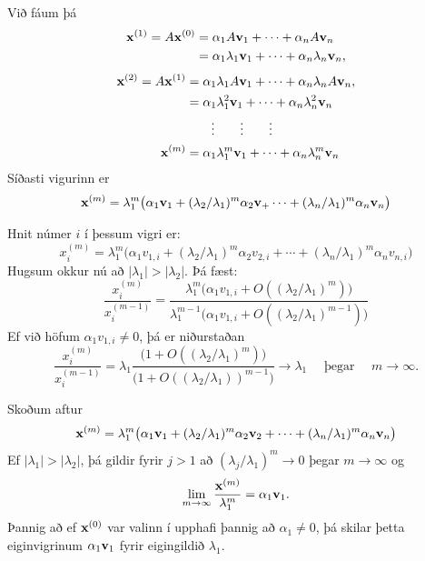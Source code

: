 \documentclass[icelandic,a4paper,12pt]{article}
\begin{document}
Við fáum þá 
\begin{align*}
\mbox{${\bf x}$}^{(1)} =A\mbox{${\bf x}$}^{(0)}&=\alpha_1A\mbox{${\bf v}$}_1+\cdots+\alpha_nA\mbox{${\bf v}$}_n\\
&=\alpha_1\lambda_1\mbox{${\bf v}$}_1+\cdots+\alpha_n\lambda_n\mbox{${\bf v}$}_n,
\end{align*}
\pause
\begin{align*}
\mbox{${\bf x}$}^{(2)}=A\mbox{${\bf x}$}^{(1)}&=\alpha_1\lambda_1A\mbox{${\bf v}$}_1+\cdots+\alpha_n\lambda_nA\mbox{${\bf v}$}_n,\\
&=\alpha_1\lambda_1^2\mbox{${\bf v}$}_1+\cdots+\alpha_n\lambda_n^2\mbox{${\bf v}$}_n\\ 
& \qquad  \vdots\qquad  \vdots \qquad \vdots\\
\mbox{${\bf x}$}^{(m)}&=\alpha_1\lambda_1^m\mbox{${\bf v}$}_1+\cdots+\alpha_n\lambda_n^m\mbox{${\bf v}$}_n
\end{align*}
\pause
Síðasti vigurinn er 
$$
\mbox{${\bf x}$}^{(m)}=  \lambda_1^m 
\big(\alpha_1\mbox{${\bf v}$}_1+(\lambda_2/\lambda_1)^m\alpha_2\mbox{${\bf v}$}_+\cdots+
(\lambda_n/\lambda_1)^m \alpha_n\mbox{${\bf v}$}_n\big)
$$



Hnit númer $i$ í þessum vigri er: 
$$
x_i^{(m)}=  \lambda_1^m 
\big(\alpha_1v_{1,i}+(\lambda_2/\lambda_1)^m\alpha_2v_{2,i}+\cdots+
(\lambda_n/\lambda_1)^m \alpha_nv_{n,i}\big)
$$
\pause
Hugsum okkur nú að $|\lambda_1|>|\lambda_2|$. Þá fæst:
$$
\dfrac{x_i^{(m)}}{x_i^{(m-1)}}
=
\dfrac{\lambda_1^m\big(\alpha_1v_{1,i}+O((\lambda_2/\lambda_1)^m)\big)}
{\lambda_1^{m-1}\big(\alpha_1v_{1,i}+O((\lambda_2/\lambda_1)^{m-1})\big)}
$$
\pause
Ef við höfum $\alpha_1v_{1,i}\neq 0$, þá er niðurstaðan
$$
\dfrac{x_i^{(m)}}{x_i^{(m-1)}}
=\lambda_1
\dfrac{\big(1+O((\lambda_2/\lambda_1)^m)\big)}
{\big(1+O((\lambda_2/\lambda_1))^{m-1}\big)} \to \lambda_1
\quad \text{ þegar }  \quad m\to \infty.
$$

Skoðum aftur
$$
\mbox{${\bf x}$}^{(m)}=  \lambda_1^m 
\big(\alpha_1\mbox{${\bf v}$}_1+(\lambda_2/\lambda_1)^m\alpha_2\mbox{${\bf v}$}_2+\cdots+
(\lambda_n/\lambda_1)^m \alpha_n\mbox{${\bf v}$}_n\big)
$$
\pause
Ef $|\lambda_1|>|\lambda_2|$, þá gildir fyrir $j > 1$ að  
$(\lambda_j/\lambda_1)^m \to 0$ þegar $m \to \infty$ og \pause
$$
\lim_{m\to \infty} \frac{\mbox{${\bf x}$}^{(m)}}{\lambda_1^m} = \alpha_1 \mbox{${\bf v}$}_1.
$$
Þannig að ef $\mbox{${\bf x}$}^{(0)}$ var valinn í upphafi þannig að $\alpha_1 \neq 0$,
þá skilar þetta eiginvigrinum $\alpha_1\mbox{${\bf v}$}_1$ fyrir eigingildið $\lambda_1$.
\end{document}

